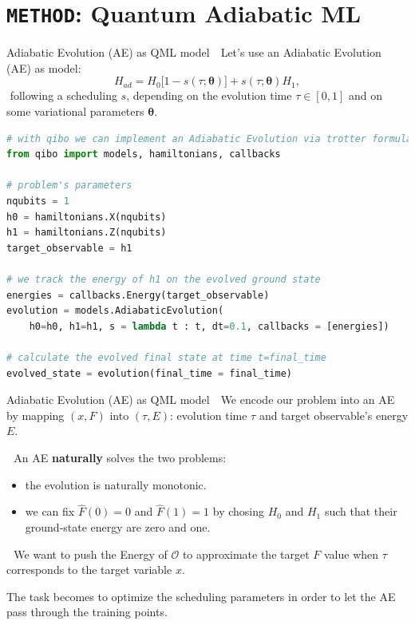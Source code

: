\documentclass[8pt, xcolor={svgnames}, hyperref={colorlinks, linkcolor=black, citecolor=amethyst, urlcolor=amethyst}]{beamer}
\begin{document}
\section{\texttt{METHOD}: Quantum Adiabatic ML}

\begin{frame}[fragile]{Adiabatic Evolution (AE) as QML model}
\large
\faArrowCircleRight\,\, Let's use an Adiabatic Evolution (AE) as model:
\begin{equation}
    H_{ad} = H_0 \bigl[1 - s(\tau; \bm{\theta})\bigr] + s(\tau; \bm{\theta}) H_1,
    \label{eq:adiabatic_evolution}
\end{equation}
\faArrowCircleRight\,\,following a scheduling $s$, depending on the evolution time $\tau\in[0,1]$
and on some variational parameters $\bm{\theta}$.
\pause
\begin{tcolorbox}
\begin{lstlisting}[language=Python]
# with qibo we can implement an Adiabatic Evolution via trotter formula
from qibo import models, hamiltonians, callbacks

# problem's parameters
nqubits = 1
h0 = hamiltonians.X(nqubits)
h1 = hamiltonians.Z(nqubits)
target_observable = h1

# we track the energy of h1 on the evolved ground state
energies = callbacks.Energy(target_observable)
evolution = models.AdiabaticEvolution(
    h0=h0, h1=h1, s = lambda t : t, dt=0.1, callbacks = [energies])

# calculate the evolved final state at time t=final_time
evolved_state = evolution(final_time = final_time)
\end{lstlisting}
\end{tcolorbox}

\end{frame}

\begin{frame}[fragile]{Adiabatic Evolution (AE) as QML model}
\large
\faArrowCircleRight\,\, We encode our problem into an AE by mapping 
$(x, F)$ into $(\tau, E)$: evolution time $\tau$ and target observable's energy $E$.   
\pause 

\faArrowCircleRight\,\, An AE \textbf{naturally} solves the two problems:
\pause
\begin{itemize}[noitemsep]
    \item[\faLineChart] the evolution is naturally monotonic.
    \pause
    \item[\faChain] we can fix $\hat{F}(0)=0$ and $\hat{F}(1)=1$ by chosing $H_0$ and $H_1$
    such that their ground-state energy are zero and one.
\end{itemize}

\pause
\faArrowCircleRight\,\, We want to push the Energy of $\mathcal{O}$ to approximate
the target $F$ value when $\tau$ corresponds to the target variable $x$.

\pause
\vspace{0.3cm}
\begin{tcolorbox}[colback=amethyst!15, title=Optimizing the AE]
The task becomes to optimize the scheduling parameters in order to let the 
AE pass through the training points.
\end{tcolorbox}
\end{frame}
\end{document}
